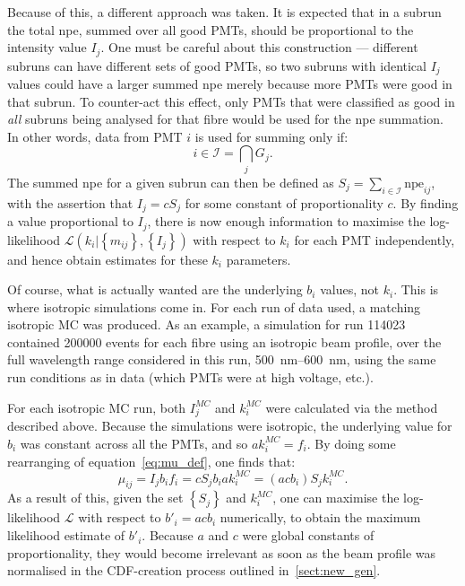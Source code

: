 Because of this, a different approach was taken. It is expected that in a subrun the total npe, summed over all good PMTs, should be proportional to the intensity value $I_{j}$. One must be careful about this construction --- different subruns can have different sets of good PMTs, so two subruns with identical $I_{j}$ values could have a larger summed npe merely because more PMTs were good in that subrun. To counter-act this effect, only PMTs that were classified as good in \textit{all} subruns being analysed for that fibre would be used for the npe summation. In other words, data from PMT $i$ is used for summing only if:
\begin{equation}
    i \in \mathcal{I} = \bigcap_{j}G_{j}.
\end{equation}
The summed npe for a given subrun can then be defined as $S_{j} = \sum_{i\in\mathcal{I}}\text{npe}_{ij}$, with the assertion that $I_{j} = cS_{j}$ for some constant of proportionality $c$. By finding a value proportional to $I_{j}$, there is now enough information to maximise the log-likelihood $\mathcal{L}\left(k_{i} | \left\{m_{ij}\right\}, \left\{I_{j}\right\}\right)$ with respect to $k_{i}$ for each PMT independently, and hence obtain estimates for these $k_{i}$ parameters.

Of course, what is actually wanted are the underlying $b_{i}$ values, not $k_{i}$. This is where isotropic simulations come in. For each run of data used, a matching isotropic MC was produced. As an example, a simulation for run \num{114023} contained \num{200000} events for each fibre using an isotropic beam profile, over the full wavelength range considered in this run, \SIrange{500}{600}{\nano\metre}, using the same run conditions as in data (which PMTs were at high voltage, etc.).

For each isotropic MC run, both $I_{j}^{MC}$ and $k_{i}^{MC}$ were calculated via the method described above. Because the simulations were isotropic, the underlying value for $b_{i}$ was constant across all the PMTs, and so $ak_{i}^{MC} = f_{i}$. By doing some rearranging of equation~\ref{eq:mu_def}, one finds that:
\begin{equation}
    \mu_{ij} = I_{j}b_{i}f_{i} = cS_{j}b_{i}ak_{i}^{MC} = (acb_{i})S_{j}k_{i}^{MC}.
\end{equation}
As a result of this, given the set $\left\{S_{j}\right\}$ and $k_{i}^{MC}$, one can maximise the log-likelihood $\mathcal{L}$ with respect to $b'_{i} = acb_{i}$ numerically, to obtain the maximum likelihood estimate of $b'_{i}$. Because $a$ and $c$ were global constants of proportionality, they would become irrelevant as soon as the beam profile was normalised in the CDF-creation process outlined in~\ref{sect:new_gen}.

